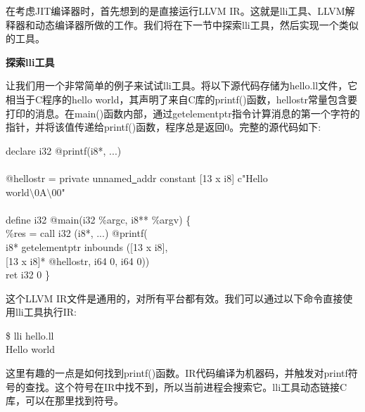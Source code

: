 
在考虑JIT编译器时，首先想到的是直接运行LLVM IR。这就是lli工具、LLVM解释器和动态编译器所做的工作。我们将在下一节中探索lli工具，然后实现一个类似的工具。\par

\hspace*{\fill} \par %
\textbf{探索lli工具}

让我们用一个非常简单的例子来试试lli工具。将以下源代码存储为hello.ll文件，它相当于C程序的hello world，其声明了来自C库的printf()函数，hellostr常量包含要打印的消息。在main()函数内部，通过getelementptr指令计算消息的第一个字符的指针，并将该值传递给printf()函数，程序总是返回0。完整的源代码如下:\par

\begin{tcolorbox}[colback=white,colframe=black]
declare i32 @printf(i8*, ...) \\
\\
@hellostr = private unnamed\underline{~}addr constant [13 x i8] c"Hello  \\
\hspace*{8cm}world$\setminus$0A$\setminus$00" \\
\\
define i32 @main(i32 \%argc, i8** \%argv) \{ \\
\hspace*{0.5cm}\%res = call i32 (i8*, ...) @printf( \\
\hspace*{3.5cm}i8* getelementptr inbounds ([13 x i8], \\
\hspace*{4.5cm}[13 x i8]* @hellostr, i64 0, i64 0)) \\
\hspace*{0.5cm}ret i32 0
\}
\end{tcolorbox}

这个LLVM IR文件是通用的，对所有平台都有效。我们可以通过以下命令直接使用lli工具执行IR:\par

\begin{tcolorbox}[colback=white,colframe=black]
\$ lli hello.ll \\
Hello world
\end{tcolorbox}

这里有趣的一点是如何找到printf()函数。IR代码编译为机器码，并触发对printf符号的查找。这个符号在IR中找不到，所以当前进程会搜索它。lli工具动态链接C库，可以在那里找到符号。\par

